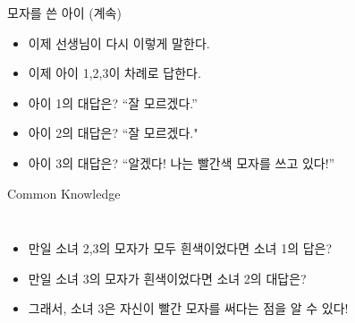\documentclass[final]{beamer}
\begin{document}
\begin{frame}[t]{모자를 쓴 아이 (계속)}
	\begin{itemize}
		\item 이제 선생님이 다시 이렇게 말한다. \\[1em] {}
		\vspace{1em}
		\item 이제 아이 1,2,3이 차례로 답한다. 
		\item 아이 1의 대답은? ``잘 모르겠다.''
		\item 아이 2의 대답은? ``잘 모르겠다."
		\item 아이 3의 대답은? ``알겠다! 나는 빨간색 모자를 쓰고 있다!''
	\end{itemize}
\end{frame}

\begin{frame}[t]{Common Knowledge}
	\begin{columns}[c]
		\begin{itemize}
			\item 만일 소녀 2,3의 모자가 모두 흰색이었다면 소녀 1의 답은?
			\item 만일 소녀 3의 모자가 흰색이었다면 소녀 2의 대답은?
			\item 그래서, 소녀 3은 자신이 빨간 모자를 써다는 점을 알 수 있다!
		\end{itemize}
	\end{columns}
\end{frame}
\end{document}
